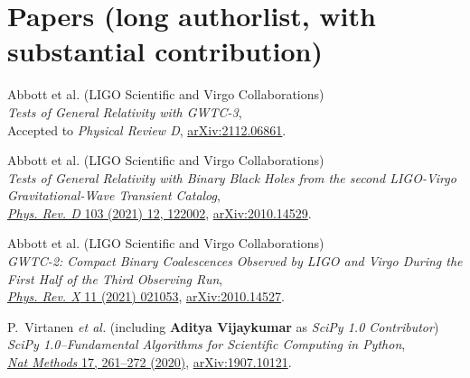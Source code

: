\section{Papers (long authorlist, with substantial contribution)}
\begin{etaremune}
	\item Abbott et al. (LIGO Scientific and Virgo Collaborations)\\
	\textit{Tests of General Relativity with GWTC-3},\\
	Accepted to \textit{Physical Review D}, \href{https://arxiv.org/abs/2112.06861}{arXiv:2112.06861}.
	
	\item Abbott et al. (LIGO Scientific and Virgo Collaborations)\\
	\textit{Tests of General Relativity with Binary Black Holes from the second LIGO-Virgo Gravitational-Wave Transient Catalog},\\
	\href{https://journals.aps.org/prd/abstract/10.1103/PhysRevD.103.122002}{\textit{Phys. Rev. D} 103 (2021) 12, 122002}, \href{https://arxiv.org/abs/2010.14529}{arXiv:2010.14529}.
	
	\item Abbott et al. (LIGO Scientific and Virgo Collaborations)\\
	\textit{GWTC-2: Compact Binary Coalescences Observed by LIGO and Virgo During the First Half of the Third Observing Run},\\
	\href{https://journals.aps.org/prx/abstract/10.1103/PhysRevX.11.021053}{\textit{Phys. Rev. X} 11 (2021) 021053}, \href{https://arxiv.org/abs/2010.14527}{arXiv:2010.14527}.	
	
	\item 	P.~Virtanen {\it et al.} (including \textbf{Aditya Vijaykumar} as \textit{SciPy 1.0 Contributor})\\
	\textit{SciPy 1.0--Fundamental Algorithms for Scientific Computing in Python},\\
	\href{https://www.nature.com/articles/s41592-019-0686-2}{\textit{Nat Methods} 17, 261–272 (2020)},
	\href{https://arxiv.org/abs/1907.10121}{arXiv:1907.10121}.
	
\end{etaremune}